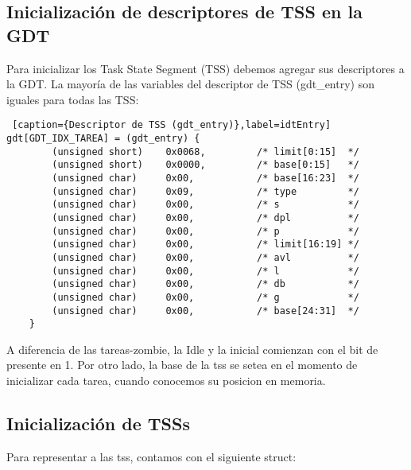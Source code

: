 \subsection*{Inicializaci\'on de descriptores de TSS en la GDT}
\par{Para inicializar los Task State Segment (TSS) debemos agregar sus descriptores a la GDT. La mayor\'ia de las variables del descriptor de TSS (gdt_entry) son iguales para todas las TSS:}

\begin{lstlisting} [caption={Descriptor de TSS (gdt_entry)},label=idtEntry]
gdt[GDT_IDX_TAREA] = (gdt_entry) {
        (unsigned short)    0x0068,         /* limit[0:15]  */
        (unsigned short)    0x0000,         /* base[0:15]   */
        (unsigned char)     0x00,           /* base[16:23]  */
        (unsigned char)     0x09,           /* type         */
        (unsigned char)     0x00,           /* s            */
        (unsigned char)     0x00,           /* dpl          */
        (unsigned char)     0x00,           /* p            */
        (unsigned char)     0x00,           /* limit[16:19] */
        (unsigned char)     0x00,           /* avl          */
        (unsigned char)     0x00,           /* l            */
        (unsigned char)     0x00,           /* db           */
        (unsigned char)     0x00,           /* g            */
        (unsigned char)     0x00,           /* base[24:31]  */
    }
\end{lstlisting}

\par{A diferencia de las tareas-zombie, la Idle y la inicial comienzan con el bit de presente en 1. Por otro lado, la base de la tss se setea en el momento de inicializar cada tarea, cuando conocemos su posicion en memoria.}
\subsection*{Inicializaci\'on de TSSs}
\par{Para representar a las tss, contamos con el siguiente struct:}

